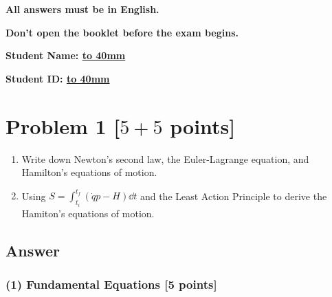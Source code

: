 \documentclass[11pt, a4paper]{article} %
\begin{document}
{\Large \bf \color{orange} \hspace{2em} All answers must be in English.}
\vspace*{2mm}

{\Large \bf \color{orange} \hspace{2em} Don't open the booklet before the exam begins.}
\vspace{5cm}

\begin{center}
{\Large \bf Student Name: \underline{\hbox to 40mm{}}}
\vspace*{8mm}

{\Large \bf Student ID: \underline{\hbox to 40mm{}}}
\vspace*{2mm}
\end{center}

\newpage
\section*{Problem 1 [$5 + 5$ points]} 
\begin{enumerate}
  \item[(1)] Write down Newton’s second law, the Euler-Lagrange equation, and Hamilton’s equations of motion. 

  \item[(2)] Using $S=\int_{t_i}^{t_f}(\dot{q}p-H )\dd t$ and the Least Action Principle to derive the Hamiton's equations of motion.

  \end{enumerate}

\subsection*{Answer}

\subsubsection*{(1) Fundamental Equations [5 points]}
\end{document}
